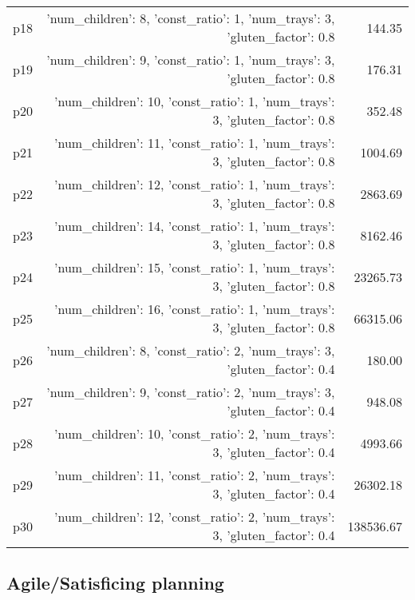 \documentclass{article}
\begin{document}
\begin{center}
\begin{tabular}{@{}l|r|r@{}}
  p18&{'num\_children': 8, 'const\_ratio': 1, 'num\_trays': 3, 'gluten\_factor': 0.8}&144.35\\
  p19&{'num\_children': 9, 'const\_ratio': 1, 'num\_trays': 3, 'gluten\_factor': 0.8}&176.31\\
  p20&{'num\_children': 10, 'const\_ratio': 1, 'num\_trays': 3, 'gluten\_factor': 0.8}&352.48\\
  p21&{'num\_children': 11, 'const\_ratio': 1, 'num\_trays': 3, 'gluten\_factor': 0.8}&1004.69\\
  p22&{'num\_children': 12, 'const\_ratio': 1, 'num\_trays': 3, 'gluten\_factor': 0.8}&2863.69\\
  p23&{'num\_children': 14, 'const\_ratio': 1, 'num\_trays': 3, 'gluten\_factor': 0.8}&8162.46\\
  p24&{'num\_children': 15, 'const\_ratio': 1, 'num\_trays': 3, 'gluten\_factor': 0.8}&23265.73\\
  p25&{'num\_children': 16, 'const\_ratio': 1, 'num\_trays': 3, 'gluten\_factor': 0.8}&66315.06\\
  p26&{'num\_children': 8, 'const\_ratio': 2, 'num\_trays': 3, 'gluten\_factor': 0.4}&180.00\\
  p27&{'num\_children': 9, 'const\_ratio': 2, 'num\_trays': 3, 'gluten\_factor': 0.4}&948.08\\
  p28&{'num\_children': 10, 'const\_ratio': 2, 'num\_trays': 3, 'gluten\_factor': 0.4}&4993.66\\
  p29&{'num\_children': 11, 'const\_ratio': 2, 'num\_trays': 3, 'gluten\_factor': 0.4}&26302.18\\
  p30&{'num\_children': 12, 'const\_ratio': 2, 'num\_trays': 3, 'gluten\_factor': 0.4}&138536.67
                            \end{tabular}
                            \end{center}
                    

                                \subsection*{Agile/Satisficing planning}
                                
\end{document}
